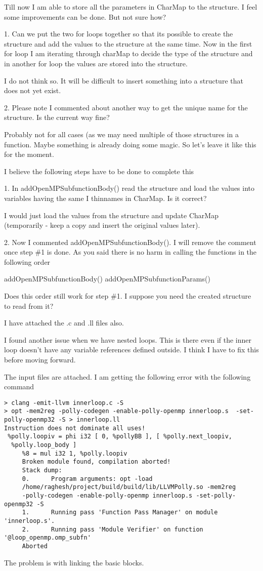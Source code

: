 \documentclass[a4paper,10pt]{article}
\begin{document}
Till now I am able to store all the parameters in CharMap to the
structure. I feel some improvements can be done. But not sure how?

1. Can we put the two for loops together so that its possible to
create the structure and add the values to the structure at the same
time. Now in the first for loop I am iterating through charMap to
decide the type of the structure and in another for loop the values
are stored into the structure.

I do not think so. It will be difficult to insert something into a structure that does not yet exist.


2. Please note I commented about another way to get the unique name
for the structure. Is the current way fine?

  Probably  not for all cases (as we may need multiple of those structures in a function. Maybe something is already doing some magic. So let's leave it like this for the moment.

      I believe the following steps have to be done to complete this

      1. In addOpenMPSubfunctionBody() read the structure and load the
      values into variables having the same I thinnames in CharMap. Is it correct?

      I would just load the values from the structure and update CharMap (temporarily - keep a copy and insert the original values later).


      2. Now I commented addOpenMPSubfunctionBody(). I will remove the
      comment once step \#1 is done. As you said there is no harm in calling
      the functions in the following order

      addOpenMPSubfunctionBody()
      addOpenMPSubfunctionParams()

      Does this order still work for step \#1. I suppose you need the created structure to read from it?


      I have attached the .c and .ll files also.


I found another issue when we have nested loops. This is there even if
the inner loop doesn't have any variable references defined outside. I
think I have to fix this before moving forward.

The input files are attached. I am getting the following error with
the following command
\begin{verbatim}
> clang -emit-llvm innerloop.c -S
> opt -mem2reg -polly-codegen -enable-polly-openmp innerloop.s  -set-polly-openmp32 -S > innerloop.ll
Instruction does not dominate all uses!
 %polly.loopiv = phi i32 [ 0, %pollyBB ], [ %polly.next_loopiv,
  %polly.loop_body ]
     %8 = mul i32 1, %polly.loopiv
     Broken module found, compilation aborted!
     Stack dump:
     0.      Program arguments: opt -load
     /home/raghesh/project/build/build/lib/LLVMPolly.so -mem2reg
     -polly-codegen -enable-polly-openmp innerloop.s -set-polly-openmp32 -S
     1.      Running pass 'Function Pass Manager' on module 'innerloop.s'.
     2.      Running pass 'Module Verifier' on function '@loop_openmp.omp_subfn'
     Aborted
     \end{verbatim}
The problem is with linking the basic blocks.
\end{document}
